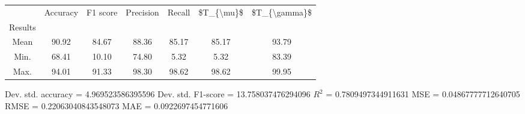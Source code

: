 \begin{tabular}{|c|c|c|c|c|c|c|}
\toprule
{} &  Accuracy &  F1 score &  Precision &  Recall &  \$T\_\{\textbackslash mu\}\$ &  \$T\_\{\textbackslash gamma\}\$ \\
Results &           &           &            &         &            &               \\
\hline
Mean    &     90.92 &     84.67 &      88.36 &   85.17 &      85.17 &         93.79 \\
Min.    &     68.41 &     10.10 &      74.80 &    5.32 &       5.32 &         83.39 \\
Max.    &     94.01 &     91.33 &      98.30 &   98.62 &      98.62 &         99.95 \\
\bottomrule
\end{tabular}

 Dev. std. accuracy = 4.969523586395596
 Dev. std. F1-score = 13.758037476294096
 $R^2$ = 0.7809497344911631
 MSE = 0.04867777712640705
 RMSE = 0.22063040843548073
 MAE = 0.0922697454771606